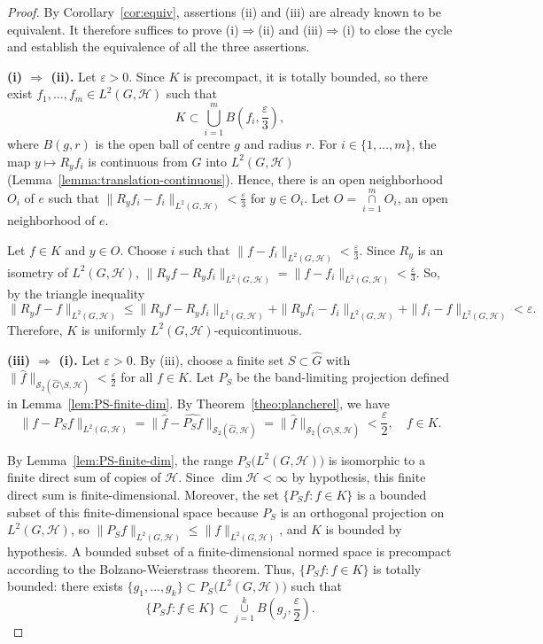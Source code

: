 \documentclass[10pt,a4paper]{amsart}
\def\union{\mathop{\cup }}
\def\inter{\mathop{\cap }}
\begin{document}
 
\begin{proof}
By Corollary~\ref{cor:equiv}, assertions (ii) and (iii) are already known to be equivalent. It therefore suffices to prove
(i)$\Rightarrow$(ii) and (iii)$\Rightarrow$(i) to close the cycle and establish the equivalence of all the three assertions.

\medskip
\noindent\textbf{(i) $\Rightarrow$ (ii).}
Let $\varepsilon>0$. Since $K$ is precompact, it is totally bounded, so there exist
$f_1,\dots,f_m\in L^2(G,\mathcal{H})$ such that
$$
K\subset\bigcup_{i=1}^m B\left(f_i,\frac{\varepsilon}{3}\right),
$$
where $B\left(g,r\right)$ is the open ball of centre $g$ and radius $r$.
For $i\in\{1,\dots,m\}$, the map $y\mapsto R_yf_i$ is continuous from $G$ into
$L^2(G,\mathcal{H})$ (Lemma~\ref{lemma:translation-continuous}). Hence,  there is an open neighborhood $O_i$ of $e$ such that
$\|R_yf_i-f_i\|_{L^2(G,\mathcal{H})}<\frac{\varepsilon}{3}$ 
for $y\in O_i$. Let $O= \inter\limits_{i=1}^mO_i$,
an open neighborhood of $e$.

Let $f\in K$ and $y\in O$. Choose $i$ such that $\|f-f_i\|_{L^2(G,\mathcal{H})}<\frac{\varepsilon}{3}$.
Since $R_y$ is an isometry of $L^2(G,\mathcal{H})$,
$\|R_yf-R_yf_i\|_{L^2(G,\mathcal{H})}=\|f-f_i\|_{L^2(G,\mathcal{H})}<\frac{\varepsilon}{3}$. So, by the triangle
inequality
$$
\|R_yf-f\|_{L^2(G,\mathcal{H})}\le\|R_yf-R_yf_i\|_{L^2(G,\mathcal{H})}+\|R_yf_i-f_i\|_{L^2(G,\mathcal{H})}+
\|f_i-f\|_{L^2(G,\mathcal{H})}<\varepsilon.
$$
Therefore,
$K$ is uniformly $L^2(G,\mathcal{H})$-equicontinuous.

\medskip
\noindent\textbf{(iii) $\Rightarrow$ (i).}
Let $\varepsilon>0$. By (iii), choose a finite set $S\subset\widehat{G}$ with
$\|\widehat f\|_{\mathscr{S}_2(\widehat{G}\setminus S,\mathcal{H})}<\frac{\varepsilon}{2}$ for all $f\in K$. Let
$P_S$ be the band-limiting projection defined in  Lemma~\ref{lem:PS-finite-dim}.  By Theorem~\ref{theo:plancherel}, we have
$$
\|f-P_Sf\|_{L^2(G,\mathcal{H})}=\|\widehat f-\widehat{P_Sf}\|_{\mathscr{S}_2(\widehat{G},\mathcal{H})}=
\|\widehat f\|_{\mathscr{S}_2(\widehat{G}\setminus S,\mathcal{H})}<\frac{\varepsilon}{2},\quad f\in K.
$$

\noindent By Lemma~\ref{lem:PS-finite-dim}, the
range $P_S\big(L^2(G,\mathcal{H})\big)$ is isomorphic to a finite direct sum of copies of $\mathcal{H}$.  Since $\dim\mathcal{H}<\infty$ by hypothesis, this finite direct sum is finite-dimensional. Moreover, the set $\{P_Sf:f\in K\}$ is a bounded subset of this finite-dimensional space because $P_S$
is an orthogonal projection on $L^2(G,\mathcal{H})$, so $\|P_Sf\|_{L^2(G,\mathcal{H})}\le
\|f\|_{L^2(G,\mathcal{H})}$, and $K$ is bounded by hypothesis. A bounded subset of a
finite-dimensional normed space is precompact according to the Bolzano-Weierstrass theorem.  Thus, 
$\{P_Sf:f\in K\}$ is totally bounded: there exists $\{g_1,\dots,g_k\}\subset
P_S\big(L^2(G,\mathcal{H})\big)$ such that 
$$\{P_Sf:f\in K\}\subset \union\limits_{j=1}^k B\left(g_j,\frac{\varepsilon}{2}\right).$$



\end{proof}
\end{document}

